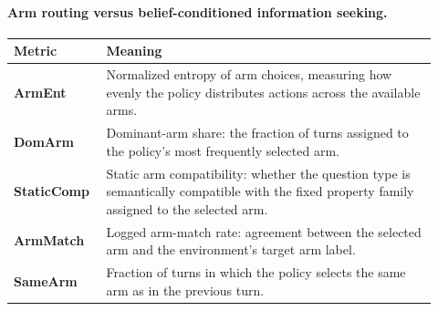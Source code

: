 \documentclass[11pt]{article}
\theoremstyle{plain}
\theoremstyle{definition}
\theoremstyle{remark}
\begin{document}


\paragraph{Arm routing versus belief-conditioned information seeking.}

\begin{table}[t]
\centering
\scriptsize
\setlength{\tabcolsep}{4pt}
\renewcommand{\arraystretch}{1.08}
\begin{tabular}{p{0.18\linewidth}p{0.74\linewidth}}
\toprule
\textbf{Metric} & \textbf{Meaning} \\
\midrule




\textbf{ArmEnt} & Normalized entropy of arm choices, measuring how evenly the policy distributes actions across the available arms. \\

\textbf{DomArm} & Dominant-arm share: the fraction of turns assigned to the policy's most frequently selected arm. \\

\textbf{StaticComp} & Static arm compatibility: whether the question type is semantically compatible with the fixed property family assigned to the selected arm. \\

\textbf{ArmMatch} & Logged arm-match rate: agreement between the selected arm and the environment's target arm label. \\

\textbf{SameArm} & Fraction of turns in which the policy selects the same arm as in the previous turn. \\


\end{tabular}
\end{table}
\end{document}
